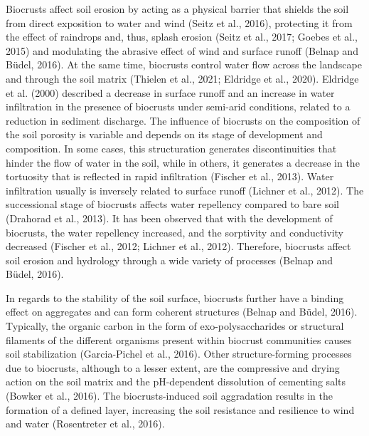 Biocrusts affect soil erosion by acting as a physical barrier that shields the soil from direct exposition to water and wind (Seitz et al., 2016), protecting it from the effect of raindrops and, thus, splash erosion (Seitz et al., 2017; Goebes et al., 2015) and modulating the abrasive effect of wind and surface runoff (Belnap and Büdel, 2016). At the same time, biocrusts control water flow across the landscape and through the soil matrix (Thielen et al., 2021; Eldridge et al., 2020). Eldridge et al. (2000) described a decrease in surface runoff and an increase in water infiltration in the presence of biocrusts under semi-arid conditions, related to a reduction in sediment discharge. The influence of biocrusts on the composition of the soil porosity is variable and depends on its stage of development and composition. In some cases, this structuration generates discontinuities that hinder the flow of water in the soil, while in others, it generates a decrease in the tortuosity that is reflected in rapid infiltration (Fischer et al., 2013). Water infiltration usually is inversely related to surface runoff (Lichner et al., 2012). The successional stage of biocrusts affects water repellency compared to bare soil (Drahorad et al., 2013). It has been observed that with the development of biocrusts, the water repellency increased, and the sorptivity and conductivity decreased (Fischer et al., 2012; Lichner et al., 2012). Therefore, biocrusts affect soil erosion and hydrology through a wide variety of processes (Belnap and Büdel, 2016).

In regards to the stability of the soil surface, biocrusts further have a binding effect on aggregates and can form coherent structures (Belnap and Büdel, 2016). Typically, the organic carbon in the form of exo-polysaccharides or structural filaments of the different organisms present within biocrust communities causes soil stabilization (Garcia-Pichel et al., 2016). Other structure-forming processes due to biocrusts, although to a lesser extent, are the compressive and drying action on the soil matrix and the pH-dependent dissolution of cementing salts (Bowker et al., 2016). The biocrusts-induced soil aggradation results in the formation of a defined layer, increasing the soil resistance and resilience to wind and water (Rosentreter et al., 2016).

